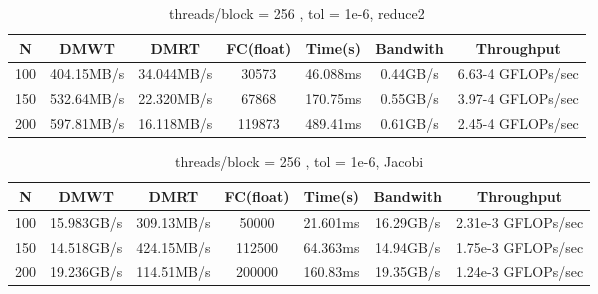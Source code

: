 \documentclass{amsart} %
\begin{document}
\begin{table}[ht]
	\caption{threads/block = 256 , tol = 1e-6, reduce2} %
	\centering %
	\begin{tabular}{c c c c c c c} %
		\hline\hline %
		N & DMWT & DMRT & FC(float) &Time(s) & Bandwith & Throughput\\ [0.5ex] %
		\hline %
		100 & 404.15MB/s & 34.044MB/s & 30573 & 46.088ms & 0.44GB/s & 6.63-4 GFLOPs/sec\\ %
		150 & 532.64MB/s & 22.320MB/s & 67868 & 170.75ms & 0.55GB/s & 3.97-4 GFLOPs/sec\\
		200 & 597.81MB/s & 16.118MB/s & 119873 &489.41ms & 0.61GB/s & 2.45-4 GFLOPs/sec\\[1ex] %
		\hline %
	\end{tabular}
	\label{table:nonlin} %
\end{table}
\FloatBarrier

\begin{table}[ht]
	\caption{threads/block = 256 , tol = 1e-6, Jacobi} %
	\centering %
	\begin{tabular}{c c c c c c c} %
		\hline\hline %
		N & DMWT & DMRT & FC(float) &Time(s) & Bandwith & Throughput\\ [0.5ex] %
		\hline %
		100 & 15.983GB/s & 309.13MB/s & 50000 & 21.601ms & 16.29GB/s & 2.31e-3 GFLOPs/sec\\ %
		150 & 14.518GB/s & 424.15MB/s & 112500 &64.363ms  & 14.94GB/s & 1.75e-3 GFLOPs/sec\\
		200 & 19.236GB/s & 114.51MB/s & 200000 &160.83ms & 19.35GB/s & 1.24e-3 GFLOPs/sec\\[1ex] %
		\hline %
	\end{tabular}
	\label{table:nonlin} %
\end{table}
\FloatBarrier



 

\end{document}
